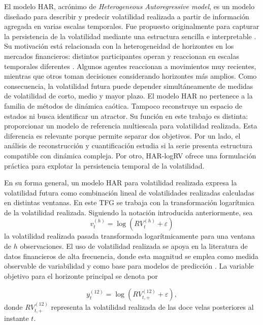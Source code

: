 El modelo HAR, acrónimo de \emph{Heterogeneous Autoregressive model}, es un modelo diseñado para describir y predecir volatilidad realizada a partir de información agregada en varias escalas temporales. Fue propuesto originalmente para capturar la persistencia de la volatilidad mediante una estructura sencilla e interpretable \cite{corsi2009}. Su motivación está relacionada con la heterogeneidad de horizontes en los mercados financieros: distintos participantes operan y reaccionan en escalas temporales diferentes \cite{muller1997}. Algunos agentes reaccionan a movimientos muy recientes, mientras que otros toman decisiones considerando horizontes más amplios. Como consecuencia, la volatilidad futura puede depender simultáneamente de medidas de volatilidad de corto, medio y mayor plazo.
El modelo HAR no pertenece a la familia de métodos de dinámica caótica. Tampoco reconstruye un espacio de estados ni busca identificar un atractor. Su función en este trabajo es distinta: proporcionar un modelo de referencia multiescala para volatilidad realizada. Esta diferencia es relevante porque permite separar dos objetivos. Por un lado, el análisis de reconstrucción y cuantificación estudia si la serie presenta estructura compatible con dinámica compleja. Por otro, HAR-logRV ofrece una formulación práctica para explotar la persistencia temporal de la volatilidad.

En su forma general, un modelo HAR para volatilidad realizada expresa la volatilidad futura como combinación lineal de volatilidades realizadas calculadas en distintas ventanas. En este TFG se trabaja con la transformación logarítmica de la volatilidad realizada. Siguiendo la notación introducida anteriormente, sea
\begin{equation}
    v_t^{(h)} = \log\left(RV_t^{(h)}+\varepsilon\right)
\end{equation}
la volatilidad realizada pasada transformada logarítmicamente para una ventana de \(h\) observaciones. El uso de volatilidad realizada se apoya en la literatura de datos financieros de alta frecuencia, donde esta magnitud se emplea como medida observable de variabilidad y como base para modelos de predicción \cite{andersen2003}. La variable objetivo para el horizonte principal se denota por

\begin{equation}
    y_t^{(12)} = \log\left(RV_{t,+}^{(12)}+\varepsilon\right),
\end{equation}
donde \(RV_{t,+}^{(12)}\) representa la volatilidad realizada de las doce velas posteriores al instante \(t\).

